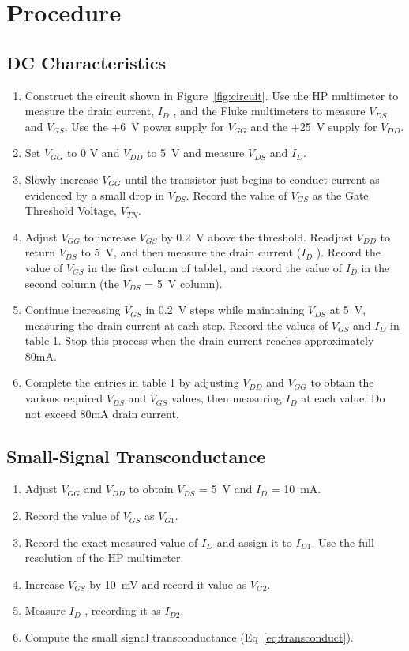 \section{Procedure}
\label{sec:procedure}

\subsection{DC Characteristics}
\label{sec:inverter}

\begin{enumerate}
\item Construct the circuit shown in Figure~\ref{fig:circuit}. Use the HP multimeter to measure the drain current, $I_D$ , and the Fluke multimeters to measure $V_{DS}$ and $V_{GS}$. Use the +\SI{6}{V} power supply for $V_{GG}$ and the +\SI{25}{V} supply for $V_{DD}$.
\item Set $V_{GG}$ to 0 V and $V_{DD}$ to \SI{5}{V} and measure $V_{DS}$ and $I_D$.
\item Slowly increase $V_{GG}$ until the transistor just begins to conduct current as evidenced by a small drop in $V_{DS}$. Record the value of $V_{GS}$ as the Gate Threshold Voltage, $V_{TN}$.
\item Adjust $V_{GG}$ to increase $V_{GS}$ by \SI{0.2}{V} above the threshold. Readjust $V_{DD}$ to return $V_{DS}$ to \SI{5}{V}, and then measure the drain current ($I_D$ ). Record the value of $V_{GS}$ in the first column of table1, and record the value of $I_D$ in the second column (the $V_{DS}$ = \SI{5}{V} column).
\item Continue increasing $V_{GS}$ in \SI{0.2}{V} steps while maintaining $V_{DS}$ at \SI{5}{V}, measuring the drain current at each step. Record the values of $V_{GS}$ and $I_D$ in table 1. Stop this process when the drain current reaches approximately 80mA.
\item Complete the entries in table 1 by adjusting $V_{DD}$ and $V_{GG}$ to obtain the various required $V_{DS}$ and $V_{GS}$ values, then measuring $I_D$ at each value. Do not exceed 80mA drain current.
\end{enumerate}

\subsection{Small-Signal Transconductance}
\label{sec:nand}

\begin{enumerate}
\item Adjust $V_{GG}$ and $V_{DD}$ to obtain $V_{DS}$ = \SI{5}{V} and $I_D$ = \SI{10}{mA}.
\item Record the value of $V_{GS}$ as $V_{G1}$.
\item Record the exact measured value of $I_D$ and assign it to $I_{D1}$. Use the full resolution of the HP multimeter.
\item Increase $V_{GS}$ by \SI{10}{mV} and record it value as $V_{G2}$.
\item Measure $I_D$ , recording it as $I_{D2}$.
\item Compute the small signal transconductance (Eq~\ref{eq:transconduct}).
\end{enumerate}

